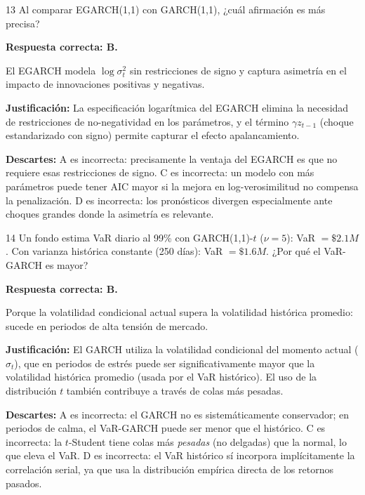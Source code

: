 \documentclass[11pt,a4paper]{article}
\newcommand{\sigmat}{\sigma^2_t}
\begin{document}
\begin{cajaCFA}{13}
Al comparar EGARCH(1,1) con GARCH(1,1), ¿cuál afirmación es más precisa?
\end{cajaCFA}

\textbf{Respuesta correcta: B.}

El EGARCH modela $\log\sigmat$ sin restricciones de signo y captura asimetría en el impacto de innovaciones positivas y negativas.

\textbf{Justificación:} La especificación logarítmica del EGARCH elimina la necesidad de restricciones de no-negatividad en los parámetros, y el término $\gamma z_{t-1}$ (choque estandarizado con signo) permite capturar el efecto apalancamiento.

\textbf{Descartes:} A es incorrecta: precisamente la ventaja del EGARCH es que no requiere esas restricciones de signo. C es incorrecta: un modelo con más parámetros puede tener AIC mayor si la mejora en log-verosimilitud no compensa la penalización. D es incorrecta: los pronósticos divergen especialmente ante choques grandes donde la asimetría es relevante.

\begin{cajaCFA}{14}
Un fondo estima VaR diario al 99\% con GARCH(1,1)-$t$ ($\nu=5$): VaR $=\$2.1M$. Con varianza histórica constante (250 días): VaR $=\$1.6M$. ¿Por qué el VaR-GARCH es mayor?
\end{cajaCFA}

\textbf{Respuesta correcta: B.}

Porque la volatilidad condicional actual supera la volatilidad histórica promedio: sucede en periodos de alta tensión de mercado.

\textbf{Justificación:} El GARCH utiliza la volatilidad condicional del momento actual ($\hat{\sigma}_t$), que en periodos de estrés puede ser significativamente mayor que la volatilidad histórica promedio (usada por el VaR histórico). El uso de la distribución $t$ también contribuye a través de colas más pesadas.

\textbf{Descartes:} A es incorrecta: el GARCH no es sistemáticamente conservador; en periodos de calma, el VaR-GARCH puede ser menor que el histórico. C es incorrecta: la $t$-Student tiene colas más \emph{pesadas} (no delgadas) que la normal, lo que eleva el VaR. D es incorrecta: el VaR histórico sí incorpora implícitamente la correlación serial, ya que usa la distribución empírica directa de los retornos pasados.
\end{document}
